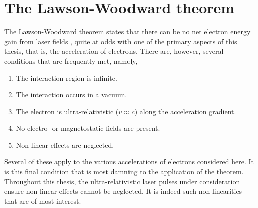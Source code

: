 
\section{The Lawson-Woodward theorem}\label{sec:intro-lawson_woodward}
The Lawson-Woodward theorem states that there can be no net electron energy gain from laser fields \cite{esareyPhysicsLaserdrivenPlasmabased2009}, quite at odds with one of the primary aspects of this thesis, that is, the acceleration of electrons. There are, however, several conditions that are frequently met, namely,
\begin{enumerate}
	\item The interaction region is infinite.
	\item The interaction occurs in a vacuum.
	\item The electron is ultra-relativistic ($v\approx c$) along the acceleration gradient.
	\item No electro- or magnetostatic fields are present.
	\item Non-linear effects are neglected.
\end{enumerate}
Several of these apply to the various accelerations of electrons considered here. It is this final condition that is most damning to the application of the theorem. Throughout this thesis, the ultra-relativistic laser pulses under consideration ensure non-linear effects cannot be neglected. It is indeed such non-linearities that are of most interest.

